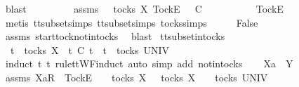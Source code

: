 \ blast\isanewline
{}\isamarkupfalse%
\isanewline
\ \ \isamarkupfalse%
\ {\isasymrho}\ {\isasymsigma}\isanewline
\ \ \isamarkupfalse%
\ assms{\isacharcolon}\ {\isachardoublequoteopen}{\isasymsigma}\ {\isasymin}\ tocks\ X{\isachardoublequoteclose}\ {\isachardoublequoteopen}{\isacharbrackleft}Tock{\isacharbrackright}\isactrlsub E\ {\isacharhash}\ {\isasymrho}\ {\isasymsubseteq}\isactrlsub C\ {\isasymsigma}{\isachardoublequoteclose}\isanewline
\ \ \isamarkupfalse%
\ \isamarkupfalse%
\ {\isasymsigma}{\isacharprime}\ \ {\isachardoublequoteopen}{\isasymsigma}\ {\isacharequal}\ {\isacharbrackleft}Tock{\isacharbrackright}\isactrlsub E\ {\isacharhash}\ {\isasymsigma}{\isacharprime}{\isachardoublequoteclose}\isanewline
\ \ \ \ \isamarkupfalse%
\ {\isacharparenleft}metis\ tt{\isacharunderscore}subset{\isachardot}simps{\isacharparenleft}{}{\isacharparenright}\ tt{\isacharunderscore}subset{\isachardot}simps{\isacharparenleft}{}{\isacharparenright}\ tocks{\isachardot}simps{\isacharparenright}\isanewline
\ \ \isamarkupfalse%
\ \isamarkupfalse%
\ False\isanewline
\ \ \ \ \isamarkupfalse%
\ assms{\isacharparenleft}{}{\isacharparenright}\ start{\isacharunderscore}tock{\isacharunderscore}notin{\isacharunderscore}tocks\ \isamarkupfalse%
\ blast\isanewline
{}\isamarkupfalse%
%
\endisatagproof
{\isafoldproof}%
%
\isadelimproof
\isanewline
%
\endisadelimproof
\isanewline
{}\isamarkupfalse%
\ tt{\isacharunderscore}subset{\isacharunderscore}in{\isacharunderscore}tocks{}{\isacharcolon}\isanewline
\ \ {\isachardoublequoteopen}t\ {\isasymin}\ tocks\ X\ {\isasymLongrightarrow}\ t\ {\isasymsubseteq}\isactrlsub C\ t{\isacharprime}\ {\isasymLongrightarrow}\ t{\isacharprime}\ {\isasymin}\ tocks\ UNIV{\isachardoublequoteclose}\isanewline
%
\isadelimproof
%
\endisadelimproof
%
\isatagproof
{}\isamarkupfalse%
\ {\isacharparenleft}induct\ t\ t{\isacharprime}\ rule{\isacharcolon}ttWF{}{\isachardot}induct{\isacharcomma}\ auto\ simp\ add{\isacharcolon}\ notin{\isacharunderscore}tocks{\isacharparenright}\isanewline
\ \ \isamarkupfalse%
\ Xa\ {\isasymrho}\ Y\ {\isasymsigma}\isanewline
\ \ \isamarkupfalse%
\ assms{\isacharcolon}\ {\isachardoublequoteopen}{\isacharbrackleft}Xa{\isacharbrackright}\isactrlsub R\ {\isacharhash}\ {\isacharbrackleft}Tock{\isacharbrackright}\isactrlsub E\ {\isacharhash}\ {\isasymrho}\ {\isasymin}\ tocks\ X{\isachardoublequoteclose}\ {\isachardoublequoteopen}{\isasymrho}\ {\isasymin}\ tocks\ X\ {\isasymLongrightarrow}\ {\isasymsigma}\ {\isasymin}\ tocks\ UNIV{\isachardoublequoteclose}\isanewline
